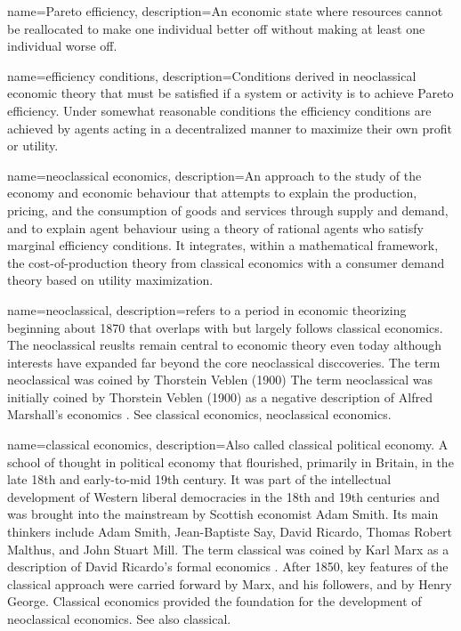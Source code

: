 {
name=Pareto efficiency,
description={An economic state where resources cannot be reallocated to make one individual better off without making at least one individual worse off.}
}

{
name=efficiency conditions,
description={Conditions derived in neoclassical economic theory that must be satisfied if a system or activity is to achieve Pareto efficiency. Under somewhat reasonable conditions the efficiency conditions are achieved by agents acting in a decentralized manner to maximize their own profit or utility.}
}

{
name=neoclassical economics,
description={An approach to the study of the economy and economic behaviour that attempts to explain the production, pricing, and the consumption of goods and services through supply and demand, and to explain agent behaviour using a theory of rational agents who satisfy \gls{marginal} efficiency conditions. It integrates, within a mathematical framework, the cost-of-production theory from classical economics with a consumer demand theory based on utility maximization.}
}


{
name=neoclassical,
description={refers to a period in economic  theorizing beginning about 1870 that overlaps with  but largely follows classical economics. The neoclassical reuslts remain central to economic theory even today although interests have expanded far beyond the core neoclassical disccoveries. The term neoclassical was  coined by Thorstein Veblen (1900) The term neoclassical was initially coined by Thorstein Veblen (1900) as a negative description of Alfred Marshall's economics \cite{colanderDeathNeoclassicalEconomics2000}. See \gls{classical economics},  \gls{neoclassical economics}. }
}

{
name=classical economics,
description={Also called classical \gls{political economy}. %
A school of thought in political economy that flourished, primarily in Britain, in the late 18th and early-to-mid 19th century. It was part of the intellectual  development of  Western liberal democracies in the 18th and 19th centuries and  was brought into the mainstream by Scottish economist Adam Smith. Its main thinkers include Adam Smith, Jean-Baptiste Say, David Ricardo, Thomas Robert Malthus, and John Stuart Mill.  The term classical was coined by Karl Marx %
as a description of David Ricardo's formal economics \cite{colanderDeathNeoclassicalEconomics2000}. After 1850, key features of the classical approach were carried forward by Marx, and his followers, and by Henry George. Classical economics provided the foundation for the development of \gls{neoclassical economics}. See also \gls{classical}.}
}

